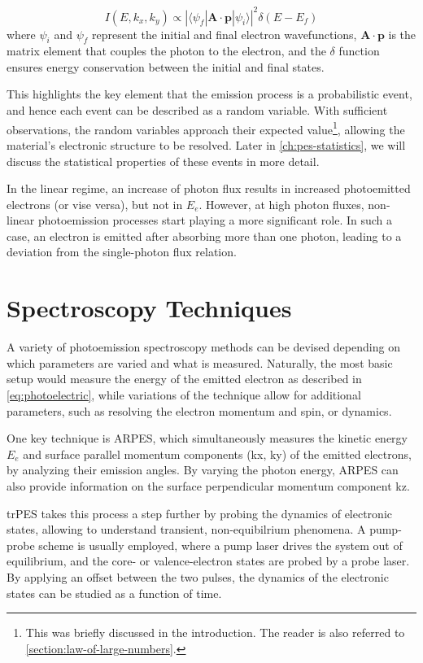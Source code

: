 \begin{equation}
    I(E, k_x, k_y) \propto |\langle \psi_f | \mathbf{A} \cdot \mathbf{p} | \psi_i \rangle|^2 \delta(E - E_f)
\end{equation}
where $\psi_i$ and $\psi_f$ represent the initial and final electron wavefunctions, $\mathbf{A} \cdot \mathbf{p}$ is the matrix element that couples the photon to the electron, and the $\delta$ function ensures energy conservation between the initial and final states.

This highlights the key element that the emission process is a probabilistic event, and hence each event can be described as a random variable. With sufficient observations, the random variables approach their expected value\footnote{This was briefly discussed in the introduction. The reader is also referred to \cref{section:law-of-large-numbers}.}, allowing the material's electronic structure to be resolved. Later in \cref{ch:pes-statistics}, we will discuss the statistical properties of these events in more detail.

In the linear regime, an increase of photon flux results in increased photoemitted electrons (or vise versa), but not in $E_e$. However, at high photon fluxes, non-linear photoemission processes start playing a more significant role. In such a case, an electron is emitted after absorbing more than one photon, leading to a deviation from the single-photon flux relation. 

\section{Spectroscopy Techniques}\label{section:spectroscopy-techniques}
A variety of photoemission spectroscopy methods can be devised depending on which parameters are varied and what is measured. Naturally, the most basic setup would measure the energy of the emitted electron as described in \cref{eq:photoelectric}, while variations of the technique allow for additional parameters, such as resolving the electron momentum and spin, or dynamics.

One key technique is \gls{ARPES}, which simultaneously measures the kinetic energy $E_e$ and surface parallel momentum components (\gls{kx}, \gls{ky}) of the emitted electrons, by analyzing their emission angles. By varying the photon energy, \gls{ARPES} can also provide information on the surface perpendicular momentum component \gls{kz}. 

\Gls{trPES} takes this process a step further by probing the dynamics of electronic states, allowing to understand transient, non-equibilrium phenomena. A pump-probe scheme is usually employed, where a pump laser drives the system out of equilibrium, and the core- or valence-electron states are probed by a probe laser. By applying an offset between the two pulses, the dynamics of the electronic states can be studied as a function of time.

